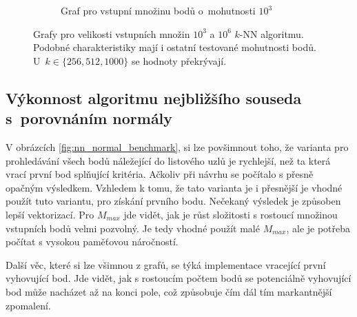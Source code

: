 \begin{figure}
\begin{subfigure}[t]{0.5\columnwidth}
\caption{Graf pro vstupní množinu bodů o~mohutnosti $10^3$}
\end{subfigure}

    \caption{Grafy pro velikosti vstupních množin $10^3$ a $10^6$ $k$-NN algoritmu. Podobné charakteristiky mají i ostatní testované mohutnosti bodů. U~$k \in \{256,512,1000\}$ se hodnoty překrývají.  }
\label{fig:kn_benchmark}



\end{figure}

\subsection*{Výkonnost algoritmu nejbližšího souseda s~porovnáním normály}
V obrázcích \ref{fig:nn_normal_benchmark}, si lze povšimnout toho, že varianta pro prohledávání všech bodů náležející do listového uzlů je rychlejší, než ta která vrací první bod splňující kritéria. Ačkoliv při návrhu se počítalo s přesně opačným výsledkem. Vzhledem k tomu, že tato varianta je i přesnější je vhodné použít tuto variantu, pro získání prvního bodu. Nečekaný výsledek je způsoben lepší vektorizací. Pro $M_{max}$ jde vidět, jak je růst složitosti s rostoucí množinou vstupních bodů velmi pozvolný. Je tedy vhodné použít malé $M_{max}$, ale je potřeba počítat s vysokou paměťovou náročností. 

Další věc, které si lze všimnou z grafů, se týká implementace vracející první vyhovující bod. Jde vidět, jak s rostoucím počtem bodů se potenciálně vyhovující bod může nacházet až na konci pole, což způsobuje čím dál tím markantnější zpomalení.

